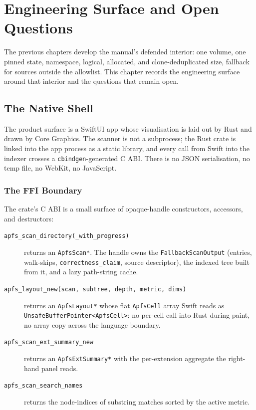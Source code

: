 \chapter{Engineering Surface and Open Questions}

The previous chapters develop the manual's defended interior: one
volume, one pinned state, namespace, logical, allocated, and
clone-deduplicated size, fallback for sources outside the
allowlist. This chapter records the engineering surface around that
interior and the questions that remain open.

\section{The Native Shell}

The product surface is a SwiftUI app whose visualisation is laid
out by Rust and drawn by Core Graphics. The scanner is not a
subprocess; the Rust crate is linked into the app process as a
static library, and every call from Swift into the indexer crosses
a \texttt{cbindgen}-generated C ABI. There is no JSON
serialisation, no temp file, no WebKit, no JavaScript.

\subsection{The FFI Boundary}

The crate's C ABI is a small surface of opaque-handle
constructors, accessors, and destructors:

\begin{description}
  \item[\texttt{apfs\_scan\_directory(\_with\_progress)}]
    returns an \texttt{ApfsScan*}. The handle owns the
    \texttt{FallbackScanOutput} (entries, walk-skips,
    \texttt{correctness\_claim}, source descriptor), the indexed
    tree built from it, and a lazy path-string cache.
  \item[\texttt{apfs\_layout\_new(scan, subtree, depth, metric,
    dims)}] returns an \texttt{ApfsLayout*} whose flat
    \texttt{ApfsCell} array Swift reads as
    \texttt{UnsafeBufferPointer<ApfsCell>}: no per-cell call into
    Rust during paint, no array copy across the language boundary.
  \item[\texttt{apfs\_scan\_ext\_summary\_new}] returns an
    \texttt{ApfsExtSummary*} with the per-extension aggregate the
    right-hand panel reads.
  \item[\texttt{apfs\_scan\_search\_names}] returns the
    node-indices of substring matches sorted by the active metric.
\end{description}

